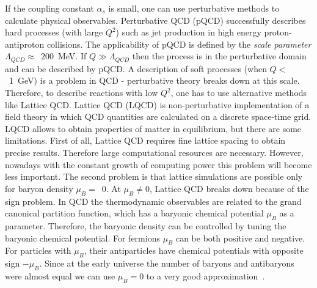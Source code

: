       If the coupling constant $\alpha_s$ is small, one can use perturbative methods to calculate physical observables.
      Perturbative QCD (pQCD) successfully describes hard processes (with large $Q^2$) such as jet production in high energy proton-antiproton collisions.
      The applicability of pQCD is defined by the \textit{scale parameter} $\Lambda_{QCD} \approx$~200~MeV.
      If $Q \gg \Lambda_{QCD}$ then the process is in the perturbative domain and can be described by pQCD.
      A description of soft processes (when $Q <$~1~GeV) is a problem in QCD - perturbative theory breaks down at this scale.
      Therefore, to describe reactions with low $Q^2$, one has to use alternative methods like Lattice QCD.
      Lattice QCD (LQCD) is non-perturbative implementation of a field theory in which QCD quantities are calculated on a discrete space-time grid.
      LQCD allows to obtain properties of matter in equilibrium, but there are some limitations.
      First of all, Lattice QCD requires fine lattice spacing to obtain precise results.
      Therefore large computational resources are necessary.
      However, nowadays with the constant growth of computing power this problem will become less important.
      The second problem is that lattice simulations are possible only for baryon density $\mu_B = $~0.
      At $\mu_B \neq 0$, Lattice QCD breaks down because of the sign problem.
      In QCD the thermodynamic observables are related to the grand canonical partition function, which has a baryonic chemical potential $\mu_B$ as a parameter.
      Therefore, the baryonic density can be controlled by tuning the baryonic chemical potential.
      For fermions $\mu_B$ can be both positive and negative.
      For particles with $\mu_B$, their antiparticles have chemical potentials with opposite sign $-\mu_B$.
      Since at the early universe the number of baryons and antibaryons were almost equal we can use $\mu_B=0$ to a very good approximation~\cite{qcd_fodor}.
      \FloatBarrier

